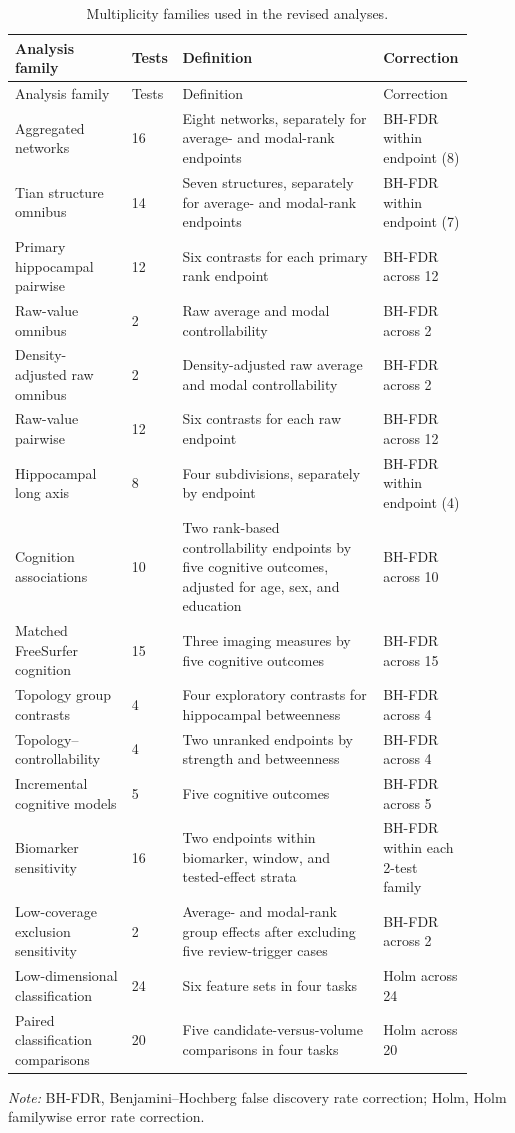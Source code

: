 \documentclass{article}
\begin{document}
\begin{landscape}
\color{blue}
\begin{longtable}{p{0.25\linewidth}p{0.08\linewidth}p{0.43\linewidth}p{0.15\linewidth}}
\caption{Multiplicity families used in the revised analyses.}\label{tab:multiplicity_families}\\
\toprule Analysis family & Tests & Definition & Correction\\ \midrule
\endfirsthead
\toprule Analysis family & Tests & Definition & Correction\\ \midrule
\endhead
Aggregated networks & 16 & Eight networks, separately for average- and modal-rank endpoints & BH-FDR within endpoint (8)\\
Tian structure omnibus & 14 & Seven structures, separately for average- and modal-rank endpoints & BH-FDR within endpoint (7)\\
Primary hippocampal pairwise & 12 & Six contrasts for each primary rank endpoint & BH-FDR across 12\\
Raw-value omnibus & 2 & Raw average and modal controllability & BH-FDR across 2\\
Density-adjusted raw omnibus & 2 & Density-adjusted raw average and modal controllability & BH-FDR across 2\\
Raw-value pairwise & 12 & Six contrasts for each raw endpoint & BH-FDR across 12\\
Hippocampal long axis & 8 & Four subdivisions, separately by endpoint & BH-FDR within endpoint (4)\\
Cognition associations & 10 & Two rank-based controllability endpoints by five cognitive outcomes, adjusted for age, sex, and education & BH-FDR across 10\\
Matched FreeSurfer cognition & 15 & Three imaging measures by five cognitive outcomes & BH-FDR across 15\\
Topology group contrasts & 4 & Four exploratory contrasts for hippocampal betweenness & BH-FDR across 4\\
Topology--controllability & 4 & Two unranked endpoints by strength and betweenness & BH-FDR across 4\\
Incremental cognitive models & 5 & Five cognitive outcomes & BH-FDR across 5\\
Biomarker sensitivity & 16 & Two endpoints within biomarker, window, and tested-effect strata & BH-FDR within each 2-test family\\
Low-coverage exclusion sensitivity & 2 & Average- and modal-rank group effects after excluding five review-trigger cases & BH-FDR across 2\\
Low-dimensional classification & 24 & Six feature sets in four tasks & Holm across 24\\
Paired classification comparisons & 20 & Five candidate-versus-volume comparisons in four tasks & Holm across 20\\
\bottomrule
\end{longtable}
\footnotesize\noindent\textit{Note:} BH-FDR, Benjamini--Hochberg false discovery rate correction; Holm, Holm familywise error rate correction.
\end{landscape}
\end{document}
